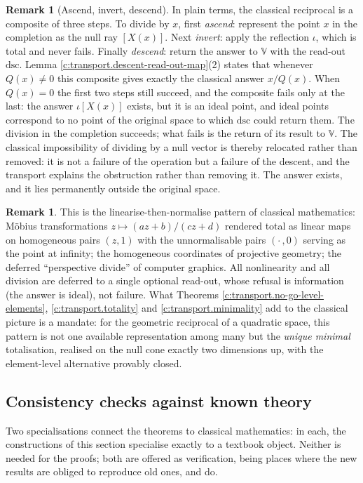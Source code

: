 \documentclass[11pt]{article}
\theoremstyle{definition}
\newtheorem{remark}[theorem]{Remark}
\theoremstyle{plain}
\providecommand{\dsc}{}\renewcommand{\dsc}{\mathrm{dsc}}
\begin{document}
\begin{remark}[Ascend, invert, descend]\label{c:note.transport.ascend-invert-descend}
In plain terms, the classical reciprocal is a composite of three steps. To divide by $x$, first \emph{ascend}: represent the point $x$ in the completion as the null ray $[X(x)]$. Next \emph{invert}: apply the reflection $\iota$, which is total and never fails. Finally \emph{descend}: return the answer to $\mathbb{V}$ with the read-out $\dsc$. Lemma \ref{c:transport.descent-read-out-map}(2) states that whenever $Q(x) \neq 0$ this composite gives exactly the classical answer $x/Q(x)$. When $Q(x) = 0$ the first two steps still succeed, and the composite fails only at the last: the answer $\iota[X(x)]$ exists, but it is an ideal point, and ideal points correspond to no point of the original space to which $\dsc$ could return them. The division in the completion succeeds; what fails is the return of its result to $\mathbb{V}$. The classical impossibility of dividing by a null vector is thereby relocated rather than removed: it is not a failure of the operation but a failure of the descent, and the transport explains the obstruction rather than removing it. The answer exists, and it lies permanently outside the original space.
\end{remark}

\begin{remark}\label{c:note.transport.classical}
This is the linearise-then-normalise pattern of classical mathematics: M\"obius transformations $z \mapsto (az+b)/(cz+d)$ rendered total as linear maps on homogeneous pairs $(z,1)$ with the unnormalisable pairs $(\cdot\,,0)$ serving as the point at infinity; the homogeneous coordinates of projective geometry; the deferred ``perspective divide'' of computer graphics. All nonlinearity and all division are deferred to a single optional read-out, whose refusal is information (the answer is ideal), not failure. What Theorems \ref{c:transport.no-go-level-elements}, \ref{c:transport.totality} and \ref{c:transport.minimality} add to the classical picture is a mandate: for the geometric reciprocal of a quadratic space, this pattern is not one available representation among many but the \emph{unique minimal} totalisation, realised on the null cone exactly two dimensions up, with the element-level alternative provably closed.
\end{remark}

\subsection*{Consistency checks against known theory}
\label{c:note.transport.setting-consistency-checks-against-known-theory}
Two specialisations connect the theorems to classical mathematics: in each, the constructions of this section specialise exactly to a textbook object. Neither is needed for the proofs; both are offered as verification, being places where the new results are obliged to reproduce old ones, and do.
\end{document}
